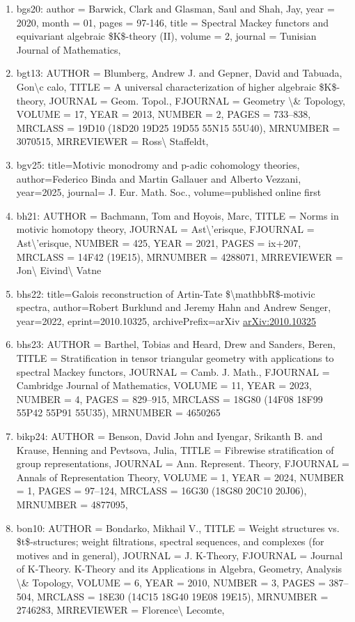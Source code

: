\documentclass[11pt]{article}
\begin{document}
\begin{enumerate}[leftmargin=*]
  \item bgs20: author = Barwick, Clark and Glasman, Saul and Shah, Jay, year = 2020, month = 01, pages = 97-146, title = Spectral Mackey functors and equivariant algebraic \$K\$-theory (II), volume = 2, journal = Tunisian Journal of Mathematics,
  \item bgt13: AUTHOR = Blumberg, Andrew J. and Gepner, David and Tabuada, Gon\textbackslash{}c calo, TITLE = A universal characterization of higher algebraic \$K\$-theory, JOURNAL = Geom. Topol., FJOURNAL = Geometry \textbackslash{}\& Topology, VOLUME = 17, YEAR = 2013, NUMBER = 2, PAGES = 733--838, MRCLASS = 19D10 (18D20 19D25 19D55 55N15 55U40), MRNUMBER = 3070515, MRREVIEWER = Ross\textbackslash{} Staffeldt,
  \item bgv25: title=Motivic monodromy and p-adic cohomology theories, author=Federico Binda and Martin Gallauer and Alberto Vezzani, year=2025, journal= J. Eur. Math. Soc., volume=published online first
  \item bh21: AUTHOR = Bachmann, Tom and Hoyois, Marc, TITLE = Norms in motivic homotopy theory, JOURNAL = Ast\textbackslash{}'erisque, FJOURNAL = Ast\textbackslash{}'erisque, NUMBER = 425, YEAR = 2021, PAGES = ix+207, MRCLASS = 14F42 (19E15), MRNUMBER = 4288071, MRREVIEWER = Jon\textbackslash{} Eivind\textbackslash{} Vatne
  \item bhs22: title=Galois reconstruction of Artin-Tate \$\textbackslash{}mathbbR\$-motivic spectra, author=Robert Burklund and Jeremy Hahn and Andrew Senger, year=2022, eprint=2010.10325, archivePrefix=arXiv \href{https://arxiv.org/abs/2010.10325}{arXiv:2010.10325}
  \item bhs23: AUTHOR = Barthel, Tobias and Heard, Drew and Sanders, Beren, TITLE = Stratification in tensor triangular geometry with applications to spectral Mackey functors, JOURNAL = Camb. J. Math., FJOURNAL = Cambridge Journal of Mathematics, VOLUME = 11, YEAR = 2023, NUMBER = 4, PAGES = 829--915, MRCLASS = 18G80 (14F08 18F99 55P42 55P91 55U35), MRNUMBER = 4650265
  \item bikp24: AUTHOR = Benson, David John and Iyengar, Srikanth B. and Krause, Henning and Pevtsova, Julia, TITLE = Fibrewise stratification of group representations, JOURNAL = Ann. Represent. Theory, FJOURNAL = Annals of Representation Theory, VOLUME = 1, YEAR = 2024, NUMBER = 1, PAGES = 97--124, MRCLASS = 16G30 (18G80 20C10 20J06), MRNUMBER = 4877095,
  \item bon10: AUTHOR = Bondarko, Mikhail V., TITLE = Weight structures vs. \$t\$-structures; weight filtrations, spectral sequences, and complexes (for motives and in general), JOURNAL = J. K-Theory, FJOURNAL = Journal of K-Theory. K-Theory and its Applications in Algebra, Geometry, Analysis \textbackslash{}\& Topology, VOLUME = 6, YEAR = 2010, NUMBER = 3, PAGES = 387--504, MRCLASS = 18E30 (14C15 18G40 19E08 19E15), MRNUMBER = 2746283, MRREVIEWER = Florence\textbackslash{} Lecomte,

\end{enumerate}
\end{document}
